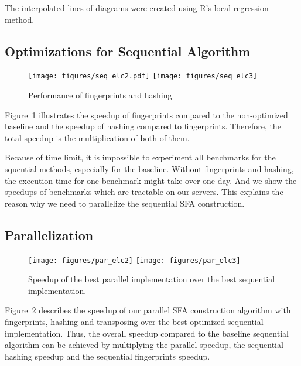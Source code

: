 \documentclass[10pt, conference, compsocconf]{IEEEtran}
\begin{document}
The interpolated lines of diagrams were created using R's local regression method.


\subsection{Optimizations for Sequential Algorithm}
\label{sec:sequential}
\begin{figure}[htp]
    \centering
    \vspace{-1mm}
    {
        \texttt{[image: figures/seq\_elc2.pdf]}
    }\hfill
    {
        \texttt{[image: figures/seq\_elc3]}
    }
    \caption{Performance of fingerprints and hashing}
    \label{fig:seqExp}
    \vskip-0mm
\end{figure}
Figure~\ref{fig:seqExp} illustrates the speedup of fingerprints compared to the non-optimized 
baseline and the speedup of hashing compared to fingerprints. Therefore, the total speedup is
the multiplication of both of them. 

Because of time limit, it is impossible to experiment all benchmarks for the squential
methods, especially for the baseline.
Without fingerprints and hashing, the execution time for one benchmark might take over one day.
And we show the speedups of benchmarks which are tractable on our servers.
This explains the reason why we need to parallelize the sequential SFA construction.


\subsection{Parallelization}
\label{sec:parallel}
\begin{figure}[htp]
    \centering
    \vspace{-1mm}
    {
        \texttt{[image: figures/par\_elc2]}
    }\hfill
    {
        \texttt{[image: figures/par\_elc3]}
    }
    \caption{Speedup of the best parallel implementation
             over the best sequential implementation.}
    \label{fig:parExp}
    \vskip-0mm
\end{figure}
Figure~\ref{fig:parExp} describes the speedup of our parallel SFA construction algorithm 
with fingerprints, hashing and transposing over the best optimized sequential implementation. 
Thus, the overall speedup compared to the baseline sequential algorithm can be achieved by
multiplying the parallel speedup, the sequential hashing speedup and the sequential fingerprints
speedup. 
\end{document}
